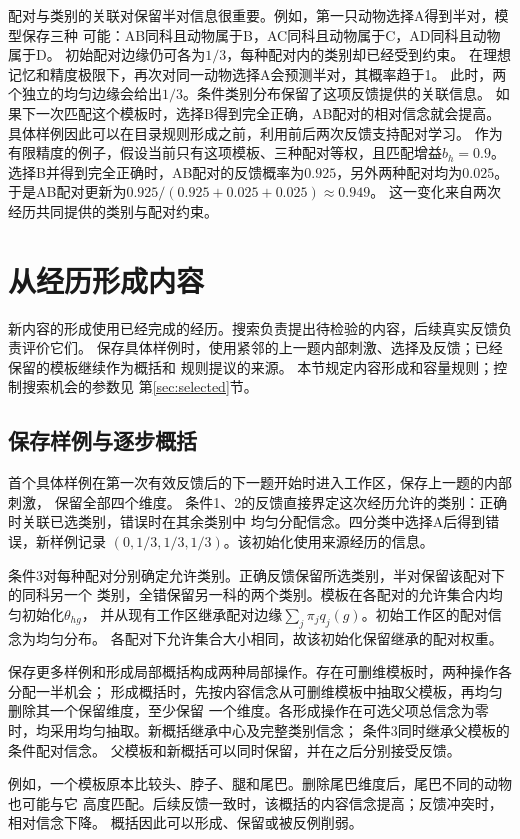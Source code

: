 \documentclass[11pt,a4paper]{article}
\numberwithin{equation}{section}
\begin{document}
配对与类别的关联对保留半对信息很重要。例如，第一只动物选择A得到半对，模型保存三种
可能：AB同科且动物属于B，AC同科且动物属于C，AD同科且动物属于D。
初始配对边缘仍可各为$1/3$，每种配对内的类别却已经受到约束。
在理想记忆和精度极限下，再次对同一动物选择A会预测半对，其概率趋于1。
此时，两个独立的均匀边缘会给出$1/3$。条件类别分布保留了这项反馈提供的关联信息。
如果下一次匹配这个模板时，选择B得到完全正确，AB配对的相对信念就会提高。
具体样例因此可以在目录规则形成之前，利用前后两次反馈支持配对学习。
作为有限精度的例子，假设当前只有这项模板、三种配对等权，且匹配增益$b_h=0.9$。
选择B并得到完全正确时，AB配对的反馈概率为$0.925$，另外两种配对均为$0.025$。
于是AB配对更新为$0.925/(0.925+0.025+0.025)\approx0.949$。
这一变化来自两次经历共同提供的类别与配对约束。

\section{从经历形成内容}
\label{sec:formation}

新内容的形成使用已经完成的经历。搜索负责提出待检验的内容，后续真实反馈负责评价它们。
保存具体样例时，使用紧邻的上一题内部刺激、选择及反馈；已经保留的模板继续作为概括和
规则提议的来源。
本节规定内容形成和容量规则；控制搜索机会的参数见
第\ref{sec:selected}节。

\subsection{保存样例与逐步概括}
首个具体样例在第一次有效反馈后的下一题开始时进入工作区，保存上一题的内部刺激，
保留全部四个维度。
条件1、2的反馈直接界定这次经历允许的类别：正确时关联已选类别，错误时在其余类别中
均匀分配信念。四分类中选择A后得到错误，新样例记录
$(0,1/3,1/3,1/3)$。该初始化使用来源经历的信息。

条件3对每种配对分别确定允许类别。正确反馈保留所选类别，半对保留该配对下的同科另一个
类别，全错保留另一科的两个类别。模板在各配对的允许集合内均匀初始化$\theta_{hg}$，
并从现有工作区继承配对边缘$\sum_j\pi_jq_j(g)$。初始工作区的配对信念为均匀分布。
各配对下允许集合大小相同，故该初始化保留继承的配对权重。

保存更多样例和形成局部概括构成两种局部操作。存在可删维模板时，两种操作各分配一半机会；
形成概括时，先按内容信念从可删维模板中抽取父模板，再均匀删除其一个保留维度，至少保留
一个维度。各形成操作在可选父项总信念为零时，均采用均匀抽取。新概括继承中心及完整类别信念；
条件3同时继承父模板的条件配对信念。
父模板和新概括可以同时保留，并在之后分别接受反馈。

例如，一个模板原本比较头、脖子、腿和尾巴。删除尾巴维度后，尾巴不同的动物也可能与它
高度匹配。后续反馈一致时，该概括的内容信念提高；反馈冲突时，相对信念下降。
概括因此可以形成、保留或被反例削弱。
\end{document}
